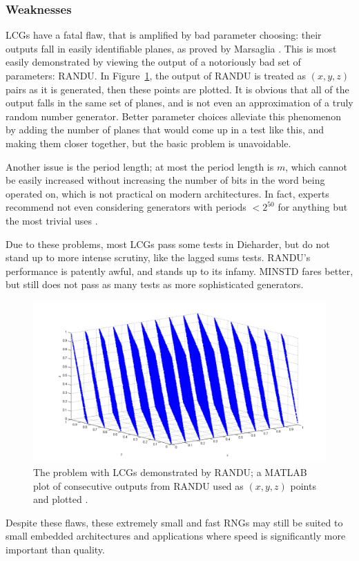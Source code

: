 \subsubsection{Weaknesses}

LCGs have a fatal flaw, that is amplified by bad parameter choosing: their outputs fall in easily identifiable planes, as proved by Marsaglia \cite{randomnumbersinplanes}. This is most easily demonstrated by viewing the output of a notoriously bad set of parameters: RANDU. In Figure~\ref{fig:randu_fig}, the output of RANDU is treated as $(x,y,z)$ pairs as it is generated, then these points are plotted. It is obvious that all of the output falls in the same set of planes, and is not even an approximation of a truly random number generator. Better parameter choices alleviate this phenomenon by adding the number of planes that would come up in a test like this, and making them closer together, but the basic problem is unavoidable.

Another issue is the period length; at most the period length is $m$, which cannot be easily increased without increasing the number of bits in the word being operated on, which is not practical on modern architectures. In fact, experts recommend not even considering generators with periods $<2^{50}$ for anything but the most trivial uses \cite{L'Ecuyer:1992:TRN:167293.167354}.

Due to these problems, most LCGs pass some tests in Dieharder, but do not stand up to more intense scrutiny, like the lagged sums tests. RANDU's performance is patently awful, and stands up to its infamy. MINSTD fares better, but still does not pass as many tests as more sophisticated generators.

\begin{figure}[tb]
    \begin{center}
        \includegraphics[width=\linewidth]{figures/randu.png}
    \end{center}
    \caption{The problem with LCGs demonstrated by RANDU; a MATLAB plot of consecutive outputs from RANDU used as $(x,y,z)$ points and plotted \cite{randu_fig}.}
    \label{fig:randu_fig}
\end{figure}

Despite these flaws, these extremely small and fast RNGs may still be suited to small embedded architectures and applications where speed is significantly more important than quality.
